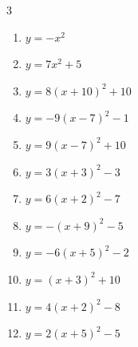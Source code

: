 \begin{multicols}{3}
\begin{enumerate}
  \item $\displaystyle y=-x^{2}$

        \phantom{$\displaystyle 頂点\left( 0 , 0 \right)$}

  \item $\displaystyle y=7x^{2}+5$

        \phantom{$\displaystyle 頂点\left( 0 , 5 \right)$}

  \item $\displaystyle y=8\left( x+10\right)^{2}+10$

        \phantom{$\displaystyle 頂点\left( -10 , 10 \right)$}

  \item $\displaystyle y=-9\left( x-7\right)^{2}-1$

        \phantom{$\displaystyle 頂点\left( 7 , -1 \right)$}

  \item $\displaystyle y=9\left( x-7\right)^{2}+10$

        \phantom{$\displaystyle 頂点\left( 7 , 10 \right)$}

  \item $\displaystyle y=3\left( x+3\right)^{2}-3$

        \phantom{$\displaystyle 頂点\left( -3 , -3 \right)$}

  \item $\displaystyle y=6\left( x+2\right)^{2}-7$

        \phantom{$\displaystyle 頂点\left( -2 , -7 \right)$}

  \item $\displaystyle y=-\left( x+9\right)^{2}-5$

        \phantom{$\displaystyle 頂点\left( -9 , -5 \right)$}

  \item $\displaystyle y=-6\left( x+5\right)^{2}-2$

        \phantom{$\displaystyle 頂点\left( -5 , -2 \right)$}

  \item $\displaystyle y=\left( x+3\right)^{2}+10$

        \phantom{$\displaystyle 頂点\left( -3 , 10 \right)$}

  \item $\displaystyle y=4\left( x+2\right)^{2}-8$

        \phantom{$\displaystyle 頂点\left( -2 , -8 \right)$}

  \item $\displaystyle y=2\left( x+5\right)^{2}-5$


\end{enumerate}
\end{multicols}
